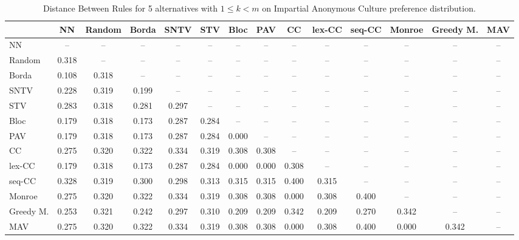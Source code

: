 
\begin{table*}
\centering
\begin{tabular}{lccccccccccccc}
\toprule
 & NN & Random & Borda & SNTV & STV & Bloc & PAV & CC & lex-CC & seq-CC & Monroe & Greedy M. & MAV \\
\midrule
NN & -- & -- & -- & -- & -- & -- & -- & -- & -- & -- & -- & -- & -- \\
Random & 0.318 & -- & -- & -- & -- & -- & -- & -- & -- & -- & -- & -- & -- \\
Borda & 0.108 & 0.318 & -- & -- & -- & -- & -- & -- & -- & -- & -- & -- & -- \\
SNTV & 0.228 & 0.319 & 0.199 & -- & -- & -- & -- & -- & -- & -- & -- & -- & -- \\
STV & 0.283 & 0.318 & 0.281 & 0.297 & -- & -- & -- & -- & -- & -- & -- & -- & -- \\
Bloc & 0.179 & 0.318 & 0.173 & 0.287 & 0.284 & -- & -- & -- & -- & -- & -- & -- & -- \\
PAV & 0.179 & 0.318 & 0.173 & 0.287 & 0.284 & 0.000 & -- & -- & -- & -- & -- & -- & -- \\
CC & 0.275 & 0.320 & 0.322 & 0.334 & 0.319 & 0.308 & 0.308 & -- & -- & -- & -- & -- & -- \\
lex-CC & 0.179 & 0.318 & 0.173 & 0.287 & 0.284 & 0.000 & 0.000 & 0.308 & -- & -- & -- & -- & -- \\
seq-CC & 0.328 & 0.319 & 0.300 & 0.298 & 0.313 & 0.315 & 0.315 & 0.400 & 0.315 & -- & -- & -- & -- \\
Monroe & 0.275 & 0.320 & 0.322 & 0.334 & 0.319 & 0.308 & 0.308 & 0.000 & 0.308 & 0.400 & -- & -- & -- \\
Greedy M. & 0.253 & 0.321 & 0.242 & 0.297 & 0.310 & 0.209 & 0.209 & 0.342 & 0.209 & 0.270 & 0.342 & -- & -- \\
MAV & 0.275 & 0.320 & 0.322 & 0.334 & 0.319 & 0.308 & 0.308 & 0.000 & 0.308 & 0.400 & 0.000 & 0.342 & -- \\
\bottomrule
\end{tabular}

\caption{Distance Between Rules for 5 alternatives with $1 \leq k < m$ on Impartial Anonymous Culture preference distribution.}
\end{table*}
